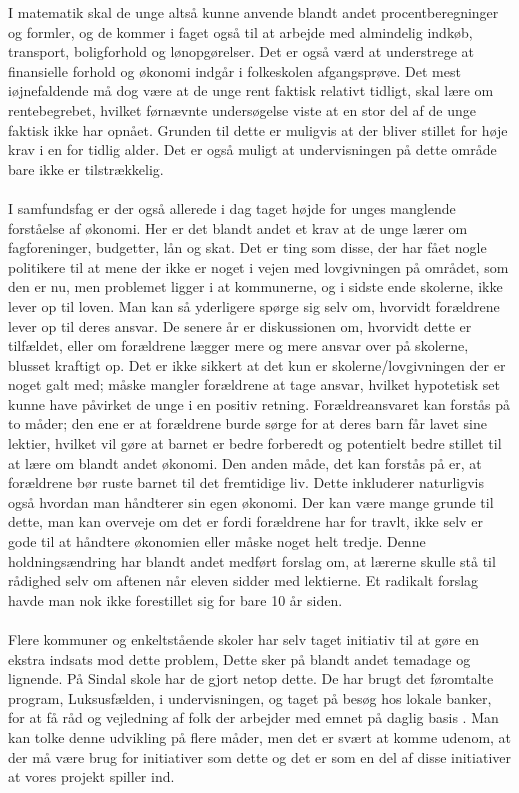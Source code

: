 I matematik skal de unge altså kunne anvende blandt andet procentberegninger og formler, og de kommer i faget også til at arbejde med almindelig indkøb, transport, boligforhold og lønopgørelser. Det er også værd at understrege at finansielle forhold og økonomi indgår i folkeskolen afgangsprøve. Det mest iøjnefaldende må dog være at de unge rent faktisk relativt tidligt, skal lære om rentebegrebet, hvilket førnævnte undersøgelse viste at en stor del af de unge faktisk ikke har opnået. Grunden til dette er muligvis at der bliver stillet for høje krav i en for tidlig alder. Det er også muligt at undervisningen på dette område bare ikke er tilstrækkelig.\\
\\
I samfundsfag er der også allerede i dag taget højde for unges manglende forståelse af økonomi. Her er det blandt andet et krav at de unge lærer om fagforeninger, budgetter, lån og skat. Det er ting som disse, der har fået nogle politikere til at mene der ikke er noget i vejen med lovgivningen på området, som den er nu, men problemet ligger i at kommunerne, og i sidste ende skolerne, ikke lever op til loven\cite{BusinessDK3}. Man kan så yderligere spørge sig selv om, hvorvidt forældrene lever op til deres ansvar. De senere år er diskussionen om, hvorvidt dette er tilfældet, eller om forældrene lægger mere og mere ansvar over på skolerne, blusset kraftigt op. Det er ikke sikkert at det kun er skolerne/lovgivningen der er noget galt med; måske mangler forældrene at tage ansvar, hvilket hypotetisk set kunne have påvirket de unge i en positiv retning. Forældreansvaret kan forstås på to måder; den ene er at forældrene burde sørge for at deres barn får lavet sine lektier, hvilket vil gøre at barnet er bedre forberedt og potentielt bedre stillet til at lære om blandt andet økonomi. Den anden måde, det kan forstås på er, at forældrene bør ruste barnet til det fremtidige liv. Dette inkluderer naturligvis også hvordan man håndterer sin egen økonomi. Der kan være mange grunde til dette, man kan overveje om det er fordi forældrene har for travlt, ikke selv er gode til at håndtere økonomien eller måske noget helt tredje. Denne holdningsændring har blandt andet medført forslag om, at lærerne skulle stå til rådighed selv om aftenen når eleven sidder med lektierne. Et radikalt forslag havde man nok ikke forestillet sig for bare 10 år siden\cite{ForaldreAnsvar}.\\
\\
Flere kommuner og enkeltstående skoler har selv taget initiativ til at gøre en ekstra indsats mod dette problem, Dette sker på blandt andet temadage og lignende. På Sindal skole har de gjort netop dette. De har brugt det føromtalte program, Luksusfælden, i undervisningen, og taget på besøg hos lokale banker, for at få råd og vejledning af folk der arbejder med emnet på daglig basis \cite{Sindal}. Man kan tolke denne udvikling på flere måder, men det er svært at komme udenom, at der må være brug for initiativer som dette og det er som en del af disse initiativer at vores projekt spiller ind.\\
